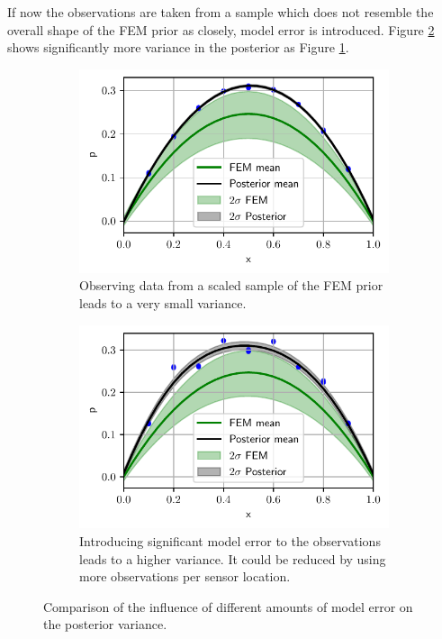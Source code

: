 \documentclass[%
  a4paper,oneside,%
  11pt,%
  smallchapters,
  style=printdev,
  extramargin,
  green,%
  rgb, <cmyk>
  ]{tubsbook}
\begin{document}
If now the observations are taken from a sample which does not resemble the overall shape of the FEM prior as closely, model error is introduced. Figure \ref{fig:ModelError1D} shows significantly more variance in the posterior as Figure \ref{fig:NoModelError1D}.
\begin{figure}[!ht]

	\begin{subfigure}[t]{.5\textwidth}
	\centering
	\includegraphics[width=1\linewidth]{../../Python/Results/1D/no_d_scaled_40proc.pdf}
	\caption{Observing data from a scaled sample of the FEM prior leads to a very small variance.}
		\label{fig:NoModelError1D}
	\end{subfigure}%
	\begin{subfigure}[t]{.5\textwidth}
	\centering
	\includegraphics[width=1\linewidth]{../../Python/Results/1D/d_scaled40proc.pdf}
\centering
\caption{Introducing significant model error to the observations leads to a higher variance. It could be reduced by using more observations per sensor location.}
\label{fig:ModelError1D}
	\end{subfigure}

\caption{Comparison of the influence of different amounts of model error on the posterior variance.}
\label{fig:ModErrNoModErr1D}
\end{figure}
%
\end{document}
